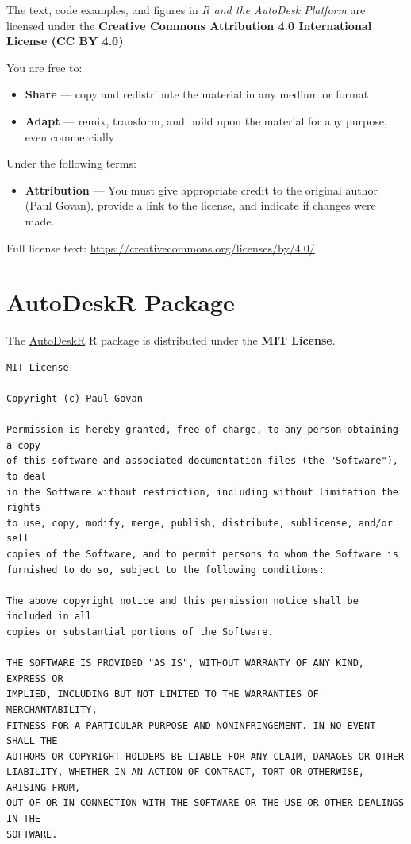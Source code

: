 \documentclass[
  11pt,
  letterpaper,
  DIV=11,
  numbers=noendperiod]{scrreprt}
\providecommand{\tightlist}{%
  \setlength{\itemsep}{0pt}\setlength{\parskip}{0pt}}
\begin{document}

The text, code examples, and figures in \emph{R and the AutoDesk
Platform} are licensed under the \textbf{Creative Commons Attribution
4.0 International License (CC BY 4.0)}.

You are free to:

\begin{itemize}
\tightlist
\item
  \textbf{Share} --- copy and redistribute the material in any medium or
  format
\item
  \textbf{Adapt} --- remix, transform, and build upon the material for
  any purpose, even commercially
\end{itemize}

Under the following terms:

\begin{itemize}
\tightlist
\item
  \textbf{Attribution} --- You must give appropriate credit to the
  original author (Paul Govan), provide a link to the license, and
  indicate if changes were made.
\end{itemize}

Full license text: \url{https://creativecommons.org/licenses/by/4.0/}

\section*{AutoDeskR Package}\label{autodeskr-package}


The \href{https://github.com/paulgovan/AutoDeskR}{AutoDeskR} R package
is distributed under the \textbf{MIT License}.

\begin{verbatim}
MIT License

Copyright (c) Paul Govan

Permission is hereby granted, free of charge, to any person obtaining a copy
of this software and associated documentation files (the "Software"), to deal
in the Software without restriction, including without limitation the rights
to use, copy, modify, merge, publish, distribute, sublicense, and/or sell
copies of the Software, and to permit persons to whom the Software is
furnished to do so, subject to the following conditions:

The above copyright notice and this permission notice shall be included in all
copies or substantial portions of the Software.

THE SOFTWARE IS PROVIDED "AS IS", WITHOUT WARRANTY OF ANY KIND, EXPRESS OR
IMPLIED, INCLUDING BUT NOT LIMITED TO THE WARRANTIES OF MERCHANTABILITY,
FITNESS FOR A PARTICULAR PURPOSE AND NONINFRINGEMENT. IN NO EVENT SHALL THE
AUTHORS OR COPYRIGHT HOLDERS BE LIABLE FOR ANY CLAIM, DAMAGES OR OTHER
LIABILITY, WHETHER IN AN ACTION OF CONTRACT, TORT OR OTHERWISE, ARISING FROM,
OUT OF OR IN CONNECTION WITH THE SOFTWARE OR THE USE OR OTHER DEALINGS IN THE
SOFTWARE.
\end{verbatim}
\end{document}
